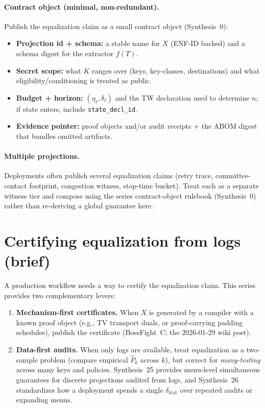 \documentclass[11pt]{article}
\begin{document}
\paragraph{Contract object (minimal, non-redundant).}
Publish the equalization claim as a small contract object (Synthesis~0):\cite{series:contractobjects}
\begin{itemize}[leftmargin=*]
\item \textbf{Projection id + schema:} a stable name for $X$ (ENF-ID backed) and a schema digest for the extractor $f(T)$.\cite{series:traceifaces}
\item \textbf{Secret scope:} what $K$ ranges over (keys, key-classes, destinations) and what eligibility/conditioning is treated as public.
\item \textbf{Budget + horizon:} $(\eta_\ell,\delta_\ell)$ and the TW declaration used to determine $n$; if state enters, include \texttt{state\_decl\_id}.\cite{series:threatwindows,series:planstateequiv}
\item \textbf{Evidence pointer:} proof objects and/or audit receipts + the ABOM digest that bundles omitted artifacts.\cite{series:abomoinl}
\end{itemize}

\paragraph{Multiple projections.}
Deployments often publish several equalization claims (retry trace, committee-contact footprint, congestion witness, stop-time bucket).
Treat each as a separate witness tier and compose using the series contract-object rulebook (Synthesis~0) rather than re-deriving a global guarantee here.\cite{series:contractobjects}
\section{Certifying equalization from logs (brief)}
A production workflow needs a way to certify the equalization claim.
This series provides two complementary levers:
\begin{enumerate}[leftmargin=*]
\item \textbf{Mechanism-first certificates.} When $X$ is generated by a compiler with a known proof object (e.g., TV transport duals, or proof-carrying padding schedules), publish the certificate (BossFight~C; the 2026-01-29 wiki post).
\item \textbf{Data-first audits.} When only logs are available, treat equalization as a two-sample problem (compare empirical $\widehat P_k$ across $k$), but correct for \emph{many-testing} across many keys and policies.
Synthesis~25 provides menu-level simultaneous guarantees for discrete projections audited from logs, and Synthesis~26 standardizes how a deployment spends a single $\delta_{\mathrm{stat}}$ over repeated audits or expanding menus.\cite{series:stataudit,series:anytimespend}
\end{enumerate}
\end{document}
